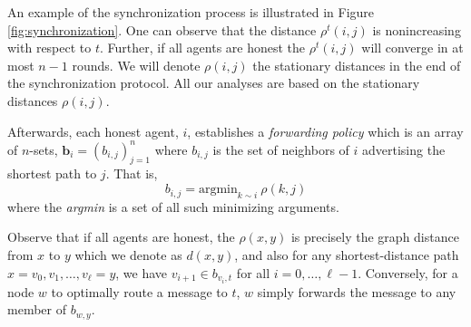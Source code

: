 \documentclass{comnet}
\begin{document}



An example of the synchronization process is illustrated in Figure \ref{fig:synchronization}. One can observe that the distance $\rho^t(i,j)$ is nonincreasing with respect to $t$. Further, if all agents are honest the $\rho^t(i,j)$ will converge in at most $n-1$ rounds. We will denote $\rho(i,j)$ the stationary distances in the end of the synchronization protocol. All our analyses are based on the stationary distances $\rho(i,j)$.

Afterwards, each honest agent, $i$, establishes a {\it forwarding policy} which is an array of $n$-sets, $\mathbf{b}_{i} = (b_{i,j})_{j=1}^n$ where $b_{i,j}$ is the set of neighbors of $i$ advertising the shortest path to $j$. That is,
\begin{equation}
{b}_{i, j} =  \text{argmin}_{k \sim i} ~ \rho(k,j) \label {uniformb} 
\end{equation}
where the {\it argmin} is a set of all such minimizing arguments.

Observe that if all agents are honest, the $\rho(x,y)$ is precisely the graph distance from $x$ to $y$ which we denote as $d(x,y)$, and also for any shortest-distance path $x= v_0, v_1, \ldots, v_{\ell} =  y$, we have $v_{i+1} \in b_{v_i,t}$ for all $i=0, \ldots, \ell-1$. Conversely, for a node $w$ to optimally route a message to $t$, $w$ simply forwards the message to any member of $b_{w,y}$.
\end{document}
